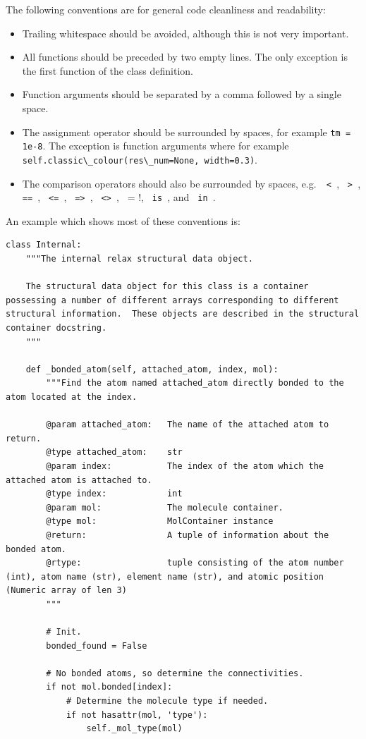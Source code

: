 The following conventions are for general code cleanliness and readability:
\begin{itemize}
  \item Trailing whitespace should be avoided, although this is not very important.
  \item All functions should be preceded by two empty lines.
    The only exception is the first function of the class definition.
  \item Function arguments should be separated by a comma followed by a single space.
  \item The assignment operator should be surrounded by spaces, for example \verb*!tm = 1e-8!.
    The exception is function arguments where for example \verb*!self.classic\_colour(res\_num=None, width=0.3)!.
  \item The comparison operators should also be surrounded by spaces, e.g.\ \verb*! < !, \verb*! > !, \verb*! == !, \verb*! <= !, \verb*! => !, \verb*! <> !, \verb*! != !, \verb*! is !, and \verb*! in !.
\end{itemize}

An example which shows most of these conventions is:
\begin{lstlisting}
class Internal:
    """The internal relax structural data object.

    The structural data object for this class is a container possessing a number of different arrays corresponding to different structural information.  These objects are described in the structural container docstring.
    """

    def _bonded_atom(self, attached_atom, index, mol):
        """Find the atom named attached_atom directly bonded to the atom located at the index.

        @param attached_atom:   The name of the attached atom to return.
        @type attached_atom:    str
        @param index:           The index of the atom which the attached atom is attached to.
        @type index:            int
        @param mol:             The molecule container.
        @type mol:              MolContainer instance
        @return:                A tuple of information about the bonded atom.
        @rtype:                 tuple consisting of the atom number (int), atom name (str), element name (str), and atomic position (Numeric array of len 3)
        """

        # Init.
        bonded_found = False

        # No bonded atoms, so determine the connectivities.
        if not mol.bonded[index]:
            # Determine the molecule type if needed.
            if not hasattr(mol, 'type'):
                self._mol_type(mol)
\end{lstlisting}



